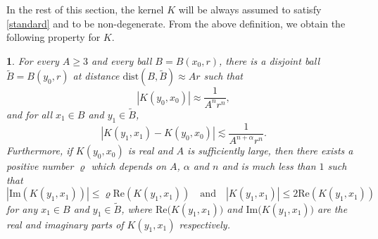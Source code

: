 \documentclass[oneside,english,a4wide]{amsart}
\numberwithin{equation}{section}
\numberwithin{figure}{section}
\theoremstyle{plain}
\theoremstyle{plain}
\theoremstyle{definition}
\theoremstyle{plain}
\newtheorem{lem}[thm]{\protect\lemmaname}
\theoremstyle{remark}
\theoremstyle{definition}
\theoremstyle{remark}
\theoremstyle{definition}
\providecommand{\lemmaname}{Lemma}
\newcommand{\8}{\infty}
\begin{document}
In the rest of this section, the kernel $K$ will be always assumed to satisfy \eqref{standard} and to be non-degenerate. From the above definition, we obtain the following property for $K$.
\begin{lem}\label{ball}
	For every $A\ge 3$ and every ball $B=B(x_0,r)$, there is a disjoint ball $\tilde{B}=B(y_0,r)$ at distance $\mathrm{dist}(B,\tilde{B})\approx Ar$ such that
	\begin{equation}\label{kx0y0an}
		|K(y_0,x_0)|\approx \frac{1}{A^nr^n},
	\end{equation}
	and for all $x_1\in B$ and $y_1\in \tilde{B}$, 
	\begin{equation}\label{kx1y1x0y0}
		|K(y_1,x_1)-K(y_0,x_0)|\lesssim\frac{1}{A^{n+\alpha}r^n}.
	\end{equation}
	Furthermore, if $K(y_0,x_0)$ is real and $A$ is sufficiently large,
	then there exists a positive number $ \varrho$ which depends on $A$, $\alpha$ and $n$ and is much less than $1$ such that
	\begin{equation}\label{88888}
		|\mathrm{Im}(K(y_1,x_1))|\le \varrho\mathrm{Re}(K(y_1,x_1))
	\quad\text{and}\quad
		|K(y_1,x_1)|\le 2\mathrm{Re}(K(y_1,x_1))
	\end{equation}
	for any $x_1\in B$ and $y_1\in \tilde{B}$, where $\mathrm{Re}\big(K(y_1,x_1)\big)$ and $\mathrm{Im}\big(K(y_1,x_1)\big)$ are the real and imaginary parts of $K(y_1,x_1)$ respectively.
\end{lem}
\end{document}
